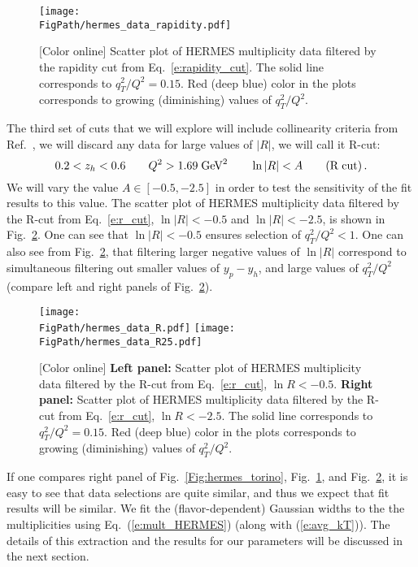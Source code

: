 \documentclass[final,3p,times,onecolumn,sort&compress,hidelinks]{elsarticle}
\newcommand\3[1]{\boldsymbol{#1}}
\newcommand*{\FigPath}{../Figs/}%
\begin{document}
\begin{figure}[htb!]
\centering
\texttt{[image: \\FigPath/hermes\_data\_rapidity.pdf]}
\caption{\label{Fig:hermes_new}
[Color online] Scatter plot of HERMES multiplicity data filtered by the rapidity cut from Eq.~\eqref{e:rapidity_cut}. The solid line corresponds to $q_T^2/Q^2=0.15$. Red (deep blue) color in the plots corresponds to growing (diminishing) values of $q_T^2/Q^2$.
}
\end{figure}

The third set of cuts that we will explore will include collinearity criteria from Ref.~\cite{Boglione:2016bph}, we will discard any data for large values of $|R|$, we will call it R-cut: 
 \begin{equation}
0.2 <  z_h < 0.6 \quad\quad Q^2 > 1.69 \; \textrm{GeV}^2  
\quad\quad   \ln |R|  < A \quad\quad{\rm (R\;cut)}\,.\label{e:r_cut}
\end{equation}
We will vary the value $A \in[-0.5, -2.5]$ in order to test the sensitivity of the fit results to this value. The scatter plot of HERMES multiplicity data filtered by the R-cut from Eq.~\eqref{e:r_cut},  $\ln |R|  < -0.5$ and $\ln |R| < -2.5$, is shown in Fig.~\ref{Fig:hermes_R}. One can see that $\ln |R|  < -0.5$ ensures selection of $q_T^2/Q^2<1$. One can also see from Fig.~\ref{Fig:hermes_R}, that filtering larger negative values of $\ln |R|$ correspond to simultaneous filtering out smaller values of $y_p - y_h$, and large values of $q_T^2/Q^2$ (compare left and right panels of Fig.~\ref{Fig:hermes_R}).
 
\begin{figure}[htb!]
\centering
\texttt{[image: \\FigPath/hermes\_data\_R.pdf]}
\texttt{[image: \\FigPath/hermes\_data\_R25.pdf]}
\caption{\label{Fig:hermes_R}
[Color online] {\bf Left panel:} Scatter plot of HERMES multiplicity data filtered by the R-cut from Eq.~\eqref{e:r_cut},  $\ln R  < -0.5$. {\bf Right panel:} Scatter plot of HERMES multiplicity data filtered by the R-cut from Eq.~\eqref{e:r_cut},  $\ln R  < -2.5$. The solid line corresponds to $q_T^2/Q^2=0.15$. Red (deep blue) color in the plots corresponds to growing (diminishing) values of $q_T^2/Q^2$.
}
\end{figure}
 

 
If one compares right panel of Fig.~\ref{Fig:hermes_torino},  Fig.~\ref{Fig:hermes_new}, and Fig.~\ref{Fig:hermes_R}, it is easy to see that data selections are quite similar, and thus we expect that fit results will be similar. We fit the (flavor-dependent) Gaussian widths to the the multiplicities using Eq.~(\ref{e:mult_HERMES}) (along with (\ref{e:avg_kT})).  The details of this extraction and the results for our parameters will be discussed in the next section.
\end{document}
